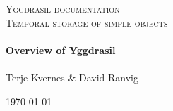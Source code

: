 \begin{titlepage}
 
\begin{center}
 
 
 

\textsc{Yggdrasil documentation}\\[1.5cm]

 
\textsc{\Large Temporal storage of simple objects}\\[0.5cm]
 
 
\HRule \\[0.5cm]
{ \huge \bfseries Overview of Yggdrasil}\\[0.4cm]
 
\HRule \\[1.5cm]
 

Terje Kvernes \& David Ranvig

\vfill
 
{\large \today}
 
\end{center}
 
\end{titlepage}
